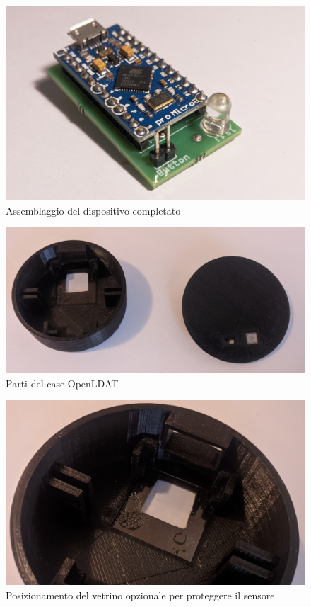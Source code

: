\begin{figure}[H]
	\centering
	\includegraphics[width=\textwidth]{Dispositivo_files/assembly_10.jpg}
	\caption{Assemblaggio del dispositivo completato}
	\label{fig:assembly_10}
\end{figure}

\begin{figure}[H]
	\centering
	\includegraphics[width=\textwidth]{Dispositivo_files/assembly_11.jpg}
	\caption{Parti del case OpenLDAT}
	\label{fig:assembly_11}
\end{figure}

\begin{figure}[H]
	\centering
	\includegraphics[width=\textwidth]{Dispositivo_files/assembly_12.jpg}
	\caption{Posizionamento del vetrino opzionale per proteggere il sensore}
	\label{fig:assembly_12}
\end{figure}

